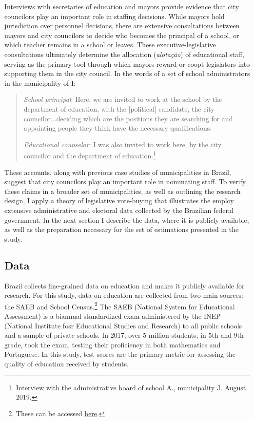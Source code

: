 \documentclass[12pt,a4paper]{article}
\begin{document}
Interviews with secretaries of education and mayors provide evidence that city councilors play an important role in staffing decisions. While mayors hold jurisdiction over personnel decisions, there are extensive consultations between mayors and city councilors to decide who becomes the principal of a school, or which teacher remains in a school or leaves. These executive-legislative consultations ultimately determine the allocation (\textit{alotação}) of educational staff, serving as the primary tool through which mayors reward or coopt legislators into supporting them in the city council. In the words of a set of school administrators in the municipality of I:

\begin{quote}
    \emph{School principal}: Here, we are invited to work at the school by the department of education, with the [political] candidate, the city councilor...deciding which are the positions they are searching for and appointing people they think have the necessary qualifications.

    \emph{Educational counselor}: I was also invited to work here, by the city councilor and the department of education.\footnote{Interview with the administrative board of school A., municipality J. August 2019.}
\end{quote}

These accounts, along with previous case studies of municipalities in Brazil, suggest that city councilors play an important role in nominating staff. To verify these claims in a broader set of municipalities, as well as outlining the research design, I apply a theory of legislative vote-buying that illustrates the  employ extensive administrative and electoral data collected by the Brazilian federal government. In the next section I describe the data, where it is publicly available, as well as the preparation necessary for the set of estimations presented in the study.

\subsection{Data}

Brazil collects fine-grained data on education and makes it publicly available for research. For this study, data on education are collected from two main sources: the SAEB and School Census.\footnote{These can be accessed \hyperlink{http://portal.inep.gov.br/web/guest/dados}{here}.} The SAEB (National System for Educational Assessment) is a biannual standardized exam administered by the INEP (National Institute fosr Educational Studies and Research) to all public schools and a sample of private schools. In 2017, over 5 million students, in 5th and 9th grade, took the exam, testing their proficiency in both mathematics and Portuguese. In this study, test scores are the primary metric for assessing the quality of education received by students.
\end{document}
